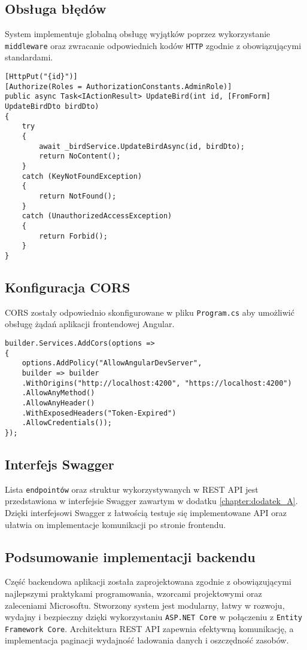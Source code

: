 \subsection{Obsługa błędów}
System implementuje globalną obsługę wyjątków poprzez wykorzystanie \texttt{middleware} oraz zwracanie odpowiednich kodów \texttt{HTTP} zgodnie z obowiązującymi standardami.

\begin{lstlisting}[style=csharp, caption={Przykład obsługi błędów w kontrolerze}]
[HttpPut("{id}")]
[Authorize(Roles = AuthorizationConstants.AdminRole)]
public async Task<IActionResult> UpdateBird(int id, [FromForm] UpdateBirdDto birdDto)
{
	try
	{
		await _birdService.UpdateBirdAsync(id, birdDto);
		return NoContent();
	}
	catch (KeyNotFoundException)
	{
		return NotFound();
	}
	catch (UnauthorizedAccessException)
	{
		return Forbid();
	}
}
\end{lstlisting}

\subsection{Konfiguracja CORS}
CORS zostały odpowiednio skonfigurowane w pliku \texttt{Program.cs} aby umożliwić obsługę żądań aplikacji frontendowej Angular.

\begin{lstlisting}[style=csharp, caption={Konfiguracja CORS}]
builder.Services.AddCors(options =>
{
	options.AddPolicy("AllowAngularDevServer",
	builder => builder
	.WithOrigins("http://localhost:4200", "https://localhost:4200")
	.AllowAnyMethod()
	.AllowAnyHeader()
	.WithExposedHeaders("Token-Expired")
	.AllowCredentials());
});
\end{lstlisting}

\subsection{Interfejs Swagger}
Lista \texttt{endpointów} oraz struktur wykorzystywanych w REST API jest przedstawiona w interfejsie Swagger zawartym w dodatku \ref{chapter:dodatek_A}. Dzięki interfejsowi Swagger z łatwością testuje się implementowane API oraz ułatwia on implementacje komunikacji po stronie frontendu.

\subsection{Podsumowanie implementacji backendu}
Część backendowa aplikacji została zaprojektowana zgodnie z obowiązującymi najlepszymi praktykami programowania, wzorcami projektowymi oraz zaleceniami Microsoftu. Stworzony system jest modularny, łatwy w rozwoju, wydajny i bezpieczny dzięki wykorzystaniu \texttt{ASP.NET Core} w połączeniu z \texttt{Entity Framework Core}. Architektura REST API zapewnia efektywną komunikację, a implementacja paginacji wydajność ładowania danych i oszczędność zasobów.

